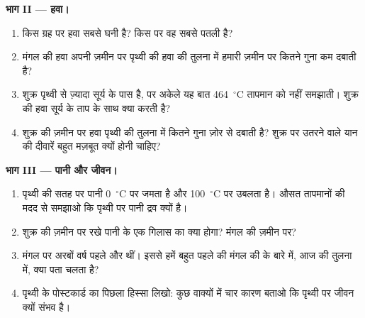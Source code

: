 \begin{problem}
\medskip
\noindent\textbf{भाग II --- हवा।}
\begin{enumerate}[resume]
  \item किस ग्रह पर हवा सबसे घनी है? किस पर वह सबसे
        पतली है?
  \item मंगल की हवा अपनी ज़मीन पर पृथ्वी की हवा की तुलना में हमारी ज़मीन पर
        कितने गुना कम दबाती है?
  \item शुक्र पृथ्वी से ज़्यादा सूर्य के पास है, पर अकेले यह बात
        464~$^\circ$C तापमान को नहीं समझाती। शुक्र की हवा
        सूर्य के ताप के साथ क्या करती है?
  \item शुक्र की ज़मीन पर हवा पृथ्वी की तुलना में कितने गुना ज़ोर से दबाती है?
        शुक्र पर उतरने वाले यान की दीवारें बहुत मज़बूत क्यों होनी चाहिए?
\end{enumerate}

\medskip
\noindent\textbf{भाग III --- पानी और जीवन।}
\begin{enumerate}[resume]
  \item पृथ्वी की सतह पर पानी 0~$^\circ$C पर जमता है और
        100~$^\circ$C पर उबलता है। औसत तापमानों की मदद से समझाओ कि पृथ्वी पर
        पानी द्रव क्यों है।
  \item शुक्र की ज़मीन पर रखे पानी के एक गिलास का क्या होगा? मंगल की
        ज़मीन पर?
  \item मंगल पर अरबों वर्ष पहले  और  थीं। इससे हमें बहुत पहले की मंगल
        की  के बारे में, आज की तुलना में, क्या पता चलता है?
  \item पृथ्वी के पोस्टकार्ड का पिछला हिस्सा लिखो: कुछ वाक्यों में चार कारण बताओ
        कि पृथ्वी पर जीवन क्यों संभव है।
\end{enumerate}
\end{problem}
